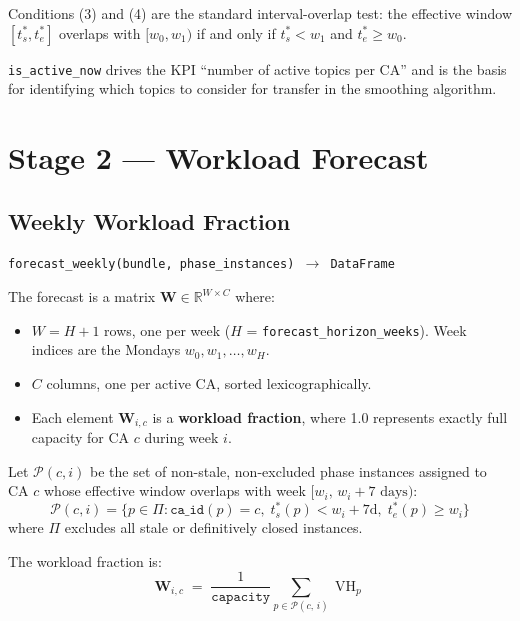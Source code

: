 \documentclass[12pt,a4paper]{report}
\DeclareMathOperator{\vh}{VH}
\begin{document}
Conditions (3) and (4) are the standard interval-overlap test:
the effective window $[t_s^*, t_e^*]$ overlaps with $[w_0, w_1)$
if and only if $t_s^* < w_1$ and $t_e^* \geq w_0$.

\texttt{is\_active\_now} drives the KPI ``number of active topics per CA''
and is the basis for identifying which topics to consider for transfer
in the smoothing algorithm.

\section{Stage 2 --- Workload Forecast}
\label{sec:forecast}

\subsection{Weekly Workload Fraction}

\texttt{forecast\_weekly(bundle, phase\_instances) $\to$ DataFrame}

The forecast is a matrix $\mathbf{W} \in \mathbb{R}^{W \times C}$ where:
\begin{itemize}
  \item $W = H + 1$ rows, one per week ($H$ = \texttt{forecast\_horizon\_weeks}).
        Week indices are the Mondays $w_0, w_1, \ldots, w_H$.
  \item $C$ columns, one per active CA, sorted lexicographically.
  \item Each element $\mathbf{W}_{i,c}$ is a \textbf{workload fraction},
        where 1.0 represents exactly full capacity for CA $c$ during week $i$.
\end{itemize}

\begin{tcolorbox}[defbox, title={Definition: Weekly Workload Fraction}]
Let $\mathcal{P}(c, i)$ be the set of non-stale, non-excluded phase
instances assigned to CA $c$ whose effective window overlaps with week
$[w_i,\, w_i + 7\text{ days})$:
\[
  \mathcal{P}(c, i) = \bigl\{
    p \in \Pi :
    \texttt{ca\_id}(p) = c,\;
    t_s^*(p) < w_i + 7\text{d},\;
    t_e^*(p) \geq w_i
  \bigr\}
\]
where $\Pi$ excludes all stale or definitively closed instances.

The workload fraction is:
\[
  \boxed{
    \mathbf{W}_{i,c} \;=\;
    \frac{1}{\texttt{capacity}} \sum_{p \in \mathcal{P}(c,\,i)} \vh_p
  }
\]
\end{tcolorbox}
\end{document}
